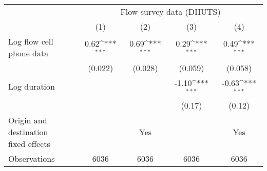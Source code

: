 {
\def\sym#1{\ifmmode^{#1}\else\(^{#1}\)\fi}
\begin{tabular}{l*{4}{c}}
\toprule
                    &\multicolumn{4}{c}{Flow survey data (DHUTS)}                                           \\\cmidrule(lr){2-5}
                    &\multicolumn{1}{c}{(1)}         &\multicolumn{1}{c}{(2)}         &\multicolumn{1}{c}{(3)}         &\multicolumn{1}{c}{(4)}         \\
\midrule
Log flow cell phone data&        0.62\sym{***}&        0.69\sym{***}&        0.29\sym{***}&        0.49\sym{***}\\
                    &     (0.022)         &     (0.028)         &     (0.059)         &     (0.058)         \\
\addlinespace
Log duration        &                     &                     &       -1.10\sym{***}&       -0.63\sym{***}\\
                    &                     &                     &      (0.17)         &      (0.12)         \\
\midrule
\shortstack{Origin and destination\\fixed effects}&                     &         Yes         &                     &         Yes         \\
Observations        &        6036         &        6036         &        6036         &        6036         \\
\bottomrule
\end{tabular}
}
